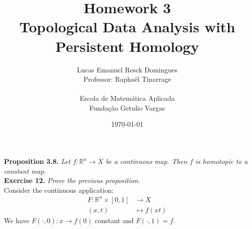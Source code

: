 \documentclass{article}
\title{Homework 3\\
    \large{Topological Data Analysis with Persistent Homology}}
\author{Lucas Emanuel Resck Domingues\\    
    Professor: Raphaël Tinarrage\\\\
    {Escola de Matemática Aplicada}\\
    {Fundação Getulio Vargas}}
\date{\today}
\begin{document}
    \maketitle

    \noindent\textbf{Proposition 3.8.} \textit{Let $f \colon    \mathbb{R}^n \to X$ be a continuous map.
    Then $f$ is homotopic to a constant map.} \\

    \noindent\textbf{Exercise 12.} \textit{Prove the previous proposition.} \\

    Consider the continuous application:
    \begin{align*}
        F \colon \mathbb{R}^n \times [0, 1] &\longrightarrow X \\
        (x, t) &\longmapsto f(xt)
    \end{align*}
    We have $F(\cdot, 0) \colon x \to f(0)$ constant and $F(\cdot, 1) = f$.
\end{document}
